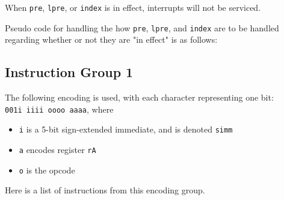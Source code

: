 \documentclass{article}
\begin{document}

	When \texttt{pre}, \texttt{lpre}, or \texttt{index} is in effect,
	interrupts will not be serviced.

	Pseudo code for handling the how \texttt{pre}, \texttt{lpre}, and
	\texttt{index} are to be handled regarding whether or not they are "in
	effect" is as follows:




	\subsection{Instruction Group 1}
	The following encoding is used, with each character representing one
	bit: \\
	\texttt{001i iiii oooo aaaa}, where

	\singlespacing
	\begin{itemize}
		\item \texttt{i} is a 5-bit sign-extended immediate, and is denoted
		\texttt{simm}
		\item \texttt{a} encodes register \texttt{rA}
		\item \texttt{o} is the opcode
	\end{itemize}
	\doublespacing

	Here is a list of instructions from this encoding group.
\end{document}
